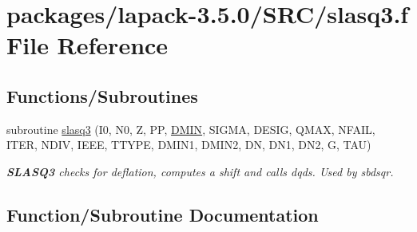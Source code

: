 \hypertarget{slasq3_8f}{}\section{packages/lapack-\/3.5.0/\+S\+R\+C/slasq3.f File Reference}
\label{slasq3_8f}
\subsection*{Functions/\+Subroutines}
\begin{DoxyCompactItemize}
\item 
subroutine \hyperlink{slasq3_8f_a1a6666b6578bef593095307a83d0e943}{slasq3} (I0, N0, Z, P\+P, \hyperlink{zeros_8h_af9a0a96e48b21c87d05acd4ed5117ba0}{D\+M\+I\+N}, S\+I\+G\+M\+A, D\+E\+S\+I\+G, Q\+M\+A\+X, N\+F\+A\+I\+L, I\+T\+E\+R, N\+D\+I\+V, I\+E\+E\+E, T\+T\+Y\+P\+E, D\+M\+I\+N1, D\+M\+I\+N2, D\+N, D\+N1, D\+N2, G, T\+A\+U)
\begin{DoxyCompactList}\small\item\em {\bfseries S\+L\+A\+S\+Q3} checks for deflation, computes a shift and calls dqds. Used by sbdsqr. \end{DoxyCompactList}\end{DoxyCompactItemize}


\subsection{Function/\+Subroutine Documentation}
\hypertarget{slasq3_8f_a1a6666b6578bef593095307a83d0e943}{}
